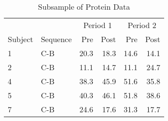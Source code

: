 \begin{table}

\caption{\label{tab:proteinDataSubsample}Subsample of Protein Data}
\centering
\begin{tabular}[t]{l>{}l|rrrr}
\toprule
\multicolumn{2}{c}{ } & \multicolumn{2}{c}{Period 1} & \multicolumn{2}{c}{Period 2} \\
\cmidrule(l{3pt}r{3pt}){3-4} \cmidrule(l{3pt}r{3pt}){5-6}
Subject & Sequence & Pre & Post & Pre & Post\\
\midrule
1 & C-B & 20.3 & 18.3 & 14.6 & 14.1\\
2 & C-B & 11.1 & 14.7 & 11.1 & 24.7\\
4 & C-B & 38.3 & 45.9 & 51.6 & 35.8\\
5 & C-B & 40.3 & 46.1 & 51.8 & 38.6\\
7 & C-B & 24.6 & 17.6 & 31.3 & 17.7\\
\bottomrule
\end{tabular}
\end{table}
